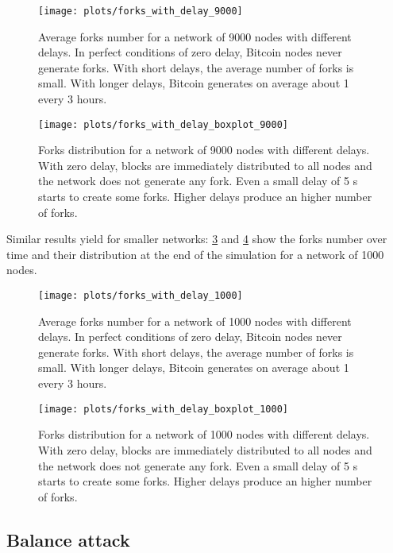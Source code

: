 \begin{figure}[ht]
	\centering
	\advance \leftskip \myextraleftmargin
	\texttt{[image: plots/forks\_with\_delay\_9000]}
	\caption[Average forks number for a network of 9000 nodes with different delays]{
		Average forks number for a network of 9000 nodes with different delays.
		In perfect conditions of zero delay, Bitcoin nodes never generate forks.
		With short delays, the average number of forks is small.
		With longer delays, Bitcoin generates on average about \num{1} every \num{3} hours.
	}
	\label{fig:forks-with-delay}
\end{figure}

\begin{figure}[ht]
	\centering
	\advance \leftskip \myextraleftmargin
	\texttt{[image: plots/forks\_with\_delay\_boxplot\_9000]}
	\caption[Forks distribution for a network of 9000 nodes with different delays]{
		Forks distribution for a network of 9000 nodes with different delays.
		With zero delay, blocks are immediately distributed to all nodes and the network does not generate any fork.
		Even a small delay of \num{5} s starts to create some forks.
		Higher delays produce an higher number of forks.
	}
	\label{fig:forks-distribution-with-delay}
\end{figure}

Similar results yield for smaller networks:
\cref{fig:forks-with-delay-small-network} and \cref{fig:forks-distribution-with-delay-small-network} show the forks number over time and their distribution at the end of the simulation for a network of \num{1000} nodes.

\begin{figure}[ht]
	\centering
	\advance \leftskip \myextraleftmargin
	\texttt{[image: plots/forks\_with\_delay\_1000]}
	\caption[Average forks number for a network of 1000 nodes with different delays]{
		Average forks number for a network of \num{1000} nodes with different delays.
		In perfect conditions of zero delay, Bitcoin nodes never generate forks.
		With short delays, the average number of forks is small.
		With longer delays, Bitcoin generates on average about \num{1} every \num{3} hours.
	}
	\label{fig:forks-with-delay-small-network}
\end{figure}

\begin{figure}[ht]
	\centering
	\advance \leftskip \myextraleftmargin
	\texttt{[image: plots/forks\_with\_delay\_boxplot\_1000]}
	\caption[Forks distribution for a network of 1000 nodes with different delays]{
		Forks distribution for a network of \num{1000} nodes with different delays.
		With zero delay, blocks are immediately distributed to all nodes and the network does not generate any fork.
		Even a small delay of \num{5} s starts to create some forks.
		Higher delays produce an higher number of forks.
	}
	\label{fig:forks-distribution-with-delay-small-network}
\end{figure}


\subsection{Balance attack}


